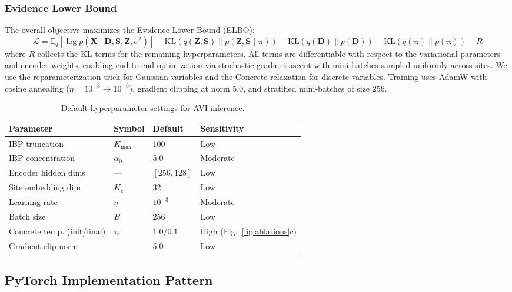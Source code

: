 \documentclass[11pt,a4paper]{article}
\theoremstyle{definition}
\begin{document}
\subsubsection{Evidence Lower Bound}
The overall objective maximizes the Evidence Lower Bound (ELBO):
\begin{equation}
  \mathcal{L} = \mathbb{E}_q\!\left[\log p(\mathbf{X} \mid \mathbf{D},\mathbf{S},\mathbf{Z},\sigma^2)\right] - \mathrm{KL}(q(\mathbf{Z},\mathbf{S})\|p(\mathbf{Z},\mathbf{S}\mid\boldsymbol{\pi})) - \mathrm{KL}(q(\mathbf{D})\|p(\mathbf{D})) - \mathrm{KL}(q(\boldsymbol{\pi})\|p(\boldsymbol{\pi})) - R \label{eq:elbo}
\end{equation}
where $R$ collects the KL terms for the remaining hyperparameters. All terms are differentiable with respect to the variational parameters and encoder weights, enabling end-to-end optimization via stochastic gradient ascent with mini-batches sampled uniformly across sites. We use the reparameterization trick for Gaussian variables and the Concrete relaxation for discrete variables. Training uses AdamW with cosine annealing ($\eta = 10^{-3} \to 10^{-6}$), gradient clipping at norm $5.0$, and stratified mini-batches of size $256$.

\begin{table}[t]
\centering
\caption{Default hyperparameter settings for AVI inference.}
\label{tab:hyper}
\small
\begin{tabular}{@{}llll@{}}
\toprule
Parameter & Symbol & Default & Sensitivity \\
\midrule
IBP truncation & $K_{\max}$ & 100 & Low \\
IBP concentration & $\alpha_0$ & 5.0 & Moderate \\
Encoder hidden dims & --- & $[256, 128]$ & Low \\
Site embedding dim & $K_e$ & 32 & Low \\
Learning rate & $\eta$ & $10^{-3}$ & Moderate \\
Batch size & $B$ & 256 & Low \\
Concrete temp. (init/final) & $\tau_c$ & $1.0 / 0.1$ & High (Fig.~\ref{fig:ablations}c) \\
Gradient clip norm & --- & 5.0 & Low \\
\bottomrule
\end{tabular}
\end{table}

\subsection{PyTorch Implementation Pattern}
\end{document}
